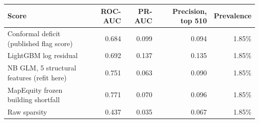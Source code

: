 \begin{tabular}{lrrrr}\toprule
Score & ROC-AUC & PR-AUC & Precision, top 510 & Prevalence\\\midrule
Conformal deficit (published flag score) & 0.684 & 0.099 & 0.094 & 1.85\%\\
LightGBM log residual & 0.692 & 0.137 & 0.135 & 1.85\%\\
NB GLM, 5 structural features (refit here) & 0.751 & 0.063 & 0.090 & 1.85\%\\
MapEquity frozen building shortfall & 0.771 & 0.070 & 0.096 & 1.85\%\\
Raw sparsity & 0.437 & 0.035 & 0.067 & 1.85\%\\
\bottomrule\end{tabular}
